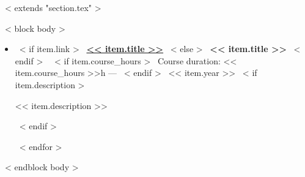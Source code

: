 ~< extends "section.tex" >~

~< block body >~

\begin{itemize}
  ~< for item in items >~
    \item 
      ~< if item.link >~
            \href{<< item.link >>}{\textbf{<< item.title >>}}
      ~< else >~
            \textbf{<< item.title >>}
      ~< endif >~
      \hfill
      ~< if item.course_hours >~
            Course duration: << item.course_hours >>h --- 
      ~< endif >~
      << item.year >>
      ~< if item.description >~
            \\ \begin{small}
                  << item.description >>
            \end{small}
      ~< endif >~  
      
  ~< endfor >~
\end{itemize}
~< endblock body >~
